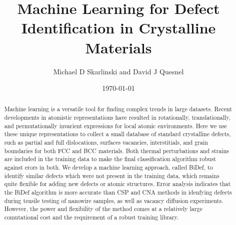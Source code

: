 \documentclass[12pt]{iopart}
\begin{document}
\title[Machine Learning for Defect Identification in Crystalline Materials]{Machine Learning for Defect Identification in Crystalline Materials}

\author{Michael D Skarlinski and David J Quesnel}

\address{University of Rochester, Hopeman Engineering Building, Rochester NY, 14627}
\vspace{10pt}
\begin{indented}
\item[]\date{\today}
\end{indented}

\begin{abstract}
Machine learning is a versatile tool for finding complex trends in large datasets. Recent developments in atomistic representations have resulted in rotationally, translationally, and permutationally invarient expressions for local atomic environments. Here we use these unique representations to collect a small database of standard crystalline defects, such as partial and full dislocations, surfaces vacancies, interstitials, and grain boundaries for both FCC and BCC materials. Both thermal perturbations and strains are included in the training data to make the final classification algorithm robust against erors in both. We develop a machine learning approach, called BiDef, to identify similar defects which were not present in the training data, which remains quite flexible for adding new defects or atomic structures. Error analysis indicates that the BiDef algorithm is more accurate than CSP and CNA methods in idenfying defects during tensile testing of nanowire samples, as well as vacancy diffusion experiments. However, the power and flexibility of the method comes at a relatively large comutational cost and the requirement of a robust training library.
\end{abstract}

%
%
%
% 
%
\end{document}
